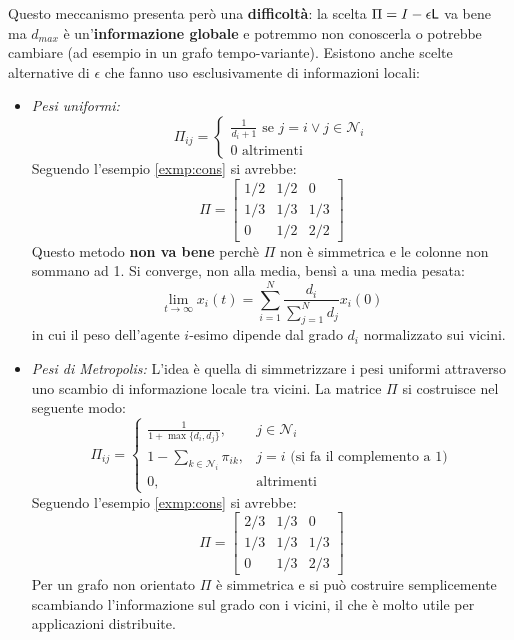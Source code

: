 Questo meccanismo presenta per\`o una \textbf{difficolt\`a}: la scelta $\Pi = I - \epsilon \mathsf{L}$ va bene ma $d_{max}$ \`e un'\textbf{informazione globale} e potremmo non conoscerla o potrebbe cambiare (ad esempio in un grafo tempo-variante).
Esistono anche scelte alternative di $\epsilon$ che fanno uso esclusivamente di informazioni locali:
\begin{itemize}
\item \textit{Pesi uniformi:}
  \begin{equation}
  \Pi_{ij} = \begin{cases}
  \frac{1}{d_i + 1} \text{ se } j=i \lor j \in \mathcal{N}_i \\
  0 \text{ altrimenti }
  \end{cases}
  \end{equation} Seguendo l'esempio \ref{exmp:cons} si avrebbe:
  \begin{equation}
  \Pi = \begin{bmatrix}
  1/2 & 1/2 & 0 \\
  1/3 & 1/3 & 1/3 \\
  0 & 1/2 & 2/2
  \end{bmatrix}
  \end{equation}
  Questo metodo \textbf{non va bene} perch\`e $\Pi$ non \`e simmetrica e le colonne non sommano ad 1. Si converge, non alla media, bens\`i a una media pesata:
  \begin{equation}
  \lim_{t \to \infty} x_i(t) = \sum_{i=1}^N \frac{d_i}{\sum_{j=1}^N d_j} x_i(0)
  \end{equation} in cui il peso dell'agente $i$-esimo dipende dal grado $d_i$ normalizzato sui vicini.

\item \textit{Pesi di Metropolis:} L'idea \`e quella di simmetrizzare i pesi uniformi attraverso uno scambio di informazione locale tra vicini. La matrice $\Pi$ si costruisce nel seguente modo:
  \begin{equation}
  \Pi_{ij} = \begin{cases}
  \frac{1}{1 + \max\{d_i, d_j\}}, & j \in \mathcal{N}_i \\
  1 - \sum_{k \in \mathcal{N}_i} \pi_{ik}, & j=i \text{ (si fa il complemento a 1)} \\
  0, & \text{altrimenti}
  \end{cases}
  \end{equation}
  Seguendo l'esempio \ref{exmp:cons} si avrebbe:
  \begin{equation}
  \Pi = \begin{bmatrix}
  2/3 & 1/3 & 0 \\
  1/3 & 1/3 & 1/3 \\
  0 & 1/3 & 2/3
  \end{bmatrix}
  \end{equation}
  Per un grafo non orientato $\Pi$ \`e simmetrica e si pu\`o costruire semplicemente scambiando l'informazione sul grado con i vicini, il che \`e molto utile per applicazioni distribuite.
\end{itemize}
